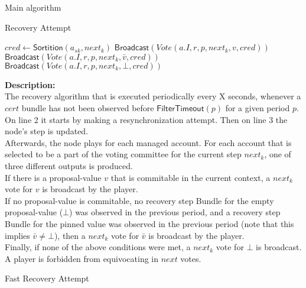 \documentclass[10pt,a4paper]{article}
\begin{document}
\begin{section}{Main algorithm}
\begin{subsection}{Recovery Attempt}
\begin{algorithm}[H]
\begin{algorithmic}[1]
            \State $cred \gets 
            \mathsf{\mathsf{Sortition}}(a_{sk}, next_k)$
                    \State $\mathsf{Broadcast}(Vote(a.I, r, p, next_k, v, cred))$
                    \State $\mathsf{Broadcast}(Vote(a.I, r, p, next_k, \bar{v}, cred))$
                \Else
                    \State $\mathsf{Broadcast}(Vote(a.I, r, p, next_k, \bot, cred))$
                \EndIf
            \EndIf
        \EndFor
        \EndFunction
        \end{algorithmic}
    \end{algorithm}
    
    
    \noindent \textbf{Description:}\\
The recovery algorithm that is executed periodically every X seconds, 
whenever a $cert$ bundle has not been observed before $\mathsf{FilterTimeout}(p)$ for a given period $p$. \\
On line 2 it starts by making a resynchronization attempt. Then on line 3 the node's step is updated.\\
Afterwards, the node plays for each managed account. For each account that is selected to be a part of the voting committee for the current
step $next_k$, one of three different outputs is produced. \\
If there is a proposal-value $v$ that is commitable in the current context, a $next_k$ vote for $v$ is broadcast by the player. \\
If no proposal-value is commitable, no recovery step Bundle for the empty proposal-value ($\bot$) was observed in the 
previous period, and a recovery step Bundle for the pinned value was observed in the previous period (note that this implies $\bar{v} \neq \bot$),
then a $next_k$ vote for $\bar{v}$ is broadcast by the player. \\
Finally, if none of the above conditions were met, a $next_k$ vote for $\bot$ is broadcast. A player is forbidden
from equivocating in $next$ votes.

\end{subsection}


\begin{subsection}{Fast Recovery Attempt}\label{ssect:FastRecovery}


\end{subsection}
\end{section}
\end{document}
